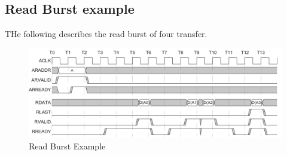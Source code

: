 \documentclass{article}
\begin{document}
\subsection{Read Burst example}
\quad THe following describes the read burst of four transfer.
\begin{figure}[H]
    \centering
    \includegraphics[width=1\textwidth]{./Resources/readBurstExample.png}
    \caption{Read Burst Example}
\end{figure}
\end{document}
